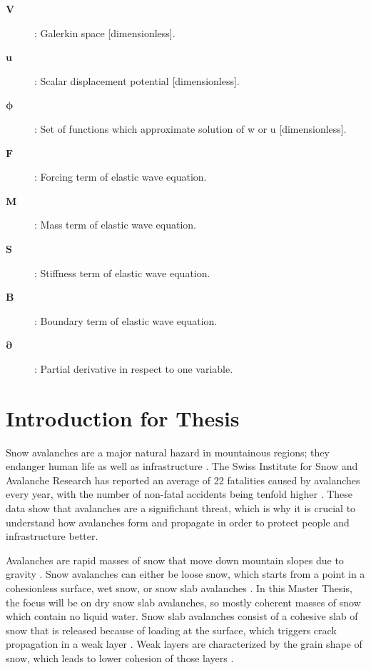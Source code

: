 \documentclass[10pt]{article}
\begin{document}
\begin{description}
  \item[$\boldsymbol{V}$]: Galerkin space [dimensionless].
  \item[$\boldsymbol{u}$]: Scalar displacement potential [dimensionless]. 
  \item[$\boldsymbol{\phi}$]: Set of functions which approximate solution of w or u [dimensionless].
  \item[$\boldsymbol{F}$]: Forcing term of elastic wave equation.
  \item[$\boldsymbol{M}$]: Mass term of elastic wave equation.
  \item[$\boldsymbol{S}$]: Stiffness term of elastic wave equation.
  \item[$\boldsymbol{B}$]: Boundary term of elastic wave equation.  
  \item[$\boldsymbol{\partial}$]: Partial derivative in respect to one variable. 
\end{description}
\newpage


\section{Introduction for Thesis}


Snow avalanches are a major natural hazard in mountainous regions; they endanger human life as well as infrastructure \parencite{schweizerSnowAvalancheFormation2003}. The Swiss Institute for Snow and Avalanche Research has reported an average of 22 fatalities caused by avalanches every year, with the number of non-fatal accidents being tenfold higher \parencite{LongtermStatistics}. These data show that avalanches are a significhant threat, which is why it is crucial to understand how avalanches form and propagate in order to protect people and infrastructure better.

  Avalanches are rapid masses of snow that move down mountain slopes due to gravity \parencite{anceySnowAvalanches2001}. Snow avalanches can either be loose snow, which starts from a point in a cohesionless surface, wet snow, or snow slab avalanches \parencite{schweizerSnowAvalancheFormation2003}. In this Master Thesis, the focus will be on dry snow slab avalanches, so mostly coherent masses of snow which contain no liquid water. Snow slab avalanches consist of a cohesive slab of snow \parencite{schweizerSnowAvalancheFormation2003} that is released because of loading at the surface, which triggers crack propagation in a weak layer \parencite{gaumeSnowFractureRelation2017a}. Weak layers are characterized by the grain shape of snow, which leads to lower cohesion of those layers \parencite{fohnMechanicalStructuralProperties1998}. 
\end{document}
